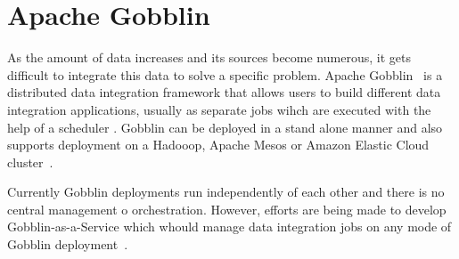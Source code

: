 \section{Apache Gobblin}

As the amount of data increases and its sources become numerous, it
gets difficult to integrate this data to solve a specific
problem. Apache Gobblin~\cite{hid-sp18-www-gobblin} is a distributed
data integration framework that allows users to build different data
integration applications, usually as separate jobs wihch are executed
with the help of a scheduler
\cite{hid-sp18-503-www-gobblin-docs}. Gobblin can be deployed in a
stand alone manner and also supports deployment on a Hadooop, Apache
Mesos or Amazon Elastic Cloud cluster~\cite{hid-sp18-503-gobblin}.

Currently Gobblin deployments run independently of each other and
there is no central management o orchestration. However, efforts are
being made to develop Gobblin-as-a-Service which whould manage data
integration jobs on any mode of Gobblin 
deployment~\cite{hid-sp18-503-www-gobblin-docs}.
